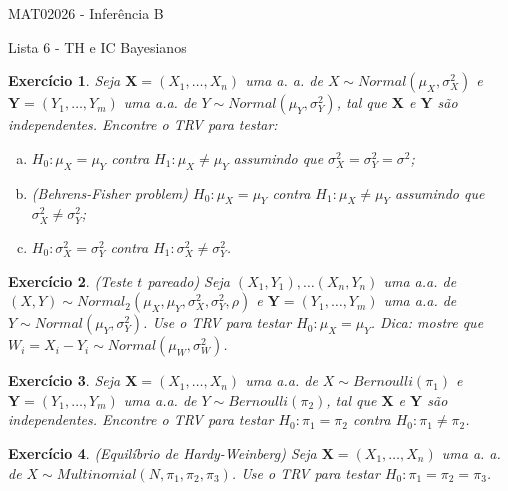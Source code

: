 \documentclass[letter,11pt]{article}
\newtheorem{exer}{Exercício}
\begin{document}
\begin{center}{ \Large MAT02026 - Inferência B }\end{center}

\begin{center}
{\large  \sc Lista 6 - TH e IC Bayesianos}
\end{center}
\vspace{5mm}

\begin{exer} \rm
Seja $\boldsymbol{X} = (X_1, \ldots, X_n)$ uma a. a. de $X \sim Normal(\mu_X, \sigma^2_X)$ e $\boldsymbol{Y} = (Y_1, \ldots, Y_m)$ uma a.a. de $Y \sim Normal(\mu_Y, \sigma^2_Y)$, tal que $\boldsymbol{X}$ e $\boldsymbol{Y}$ são independentes. Encontre o TRV para testar:
\begin{enumerate}[a)]
  \item $H_0: \mu_X = \mu_Y$ contra $H_1: \mu_X \neq \mu_Y$ assumindo que $\sigma^2_X = \sigma^2_Y = \sigma^2$;
  \item \textit{(Behrens-Fisher problem)} $H_0: \mu_X = \mu_Y$ contra $H_1: \mu_X \neq \mu_Y$ assumindo que $\sigma^2_X \neq \sigma^2_Y$;
  \item $H_0: \sigma^2_X = \sigma^2_Y$ contra $H_1: \sigma^2_X \neq \sigma^2_Y$.   
\end{enumerate}
\end{exer}


\begin{exer} \rm
\textit{(Teste $t$ pareado)} Seja $(X_1, Y_1), \ldots (X_n, Y_n)$ uma a.a. de $(X, Y) \sim Normal_2(\mu_X, \mu_Y, \sigma^2_X, \sigma^2_Y, \rho)$ e $\boldsymbol{Y} = (Y_1, \ldots, Y_m)$ uma a.a. de $Y \sim Normal(\mu_Y, \sigma^2_Y)$. Use o TRV para testar $H_0: \mu_X = \mu_Y$. Dica: mostre que $W_i = X_i - Y_i \sim Normal(\mu_W, \sigma^2_W)$. 
\end{exer}


\begin{exer} \rm
Seja $\boldsymbol{X} = (X_1, \ldots, X_n)$ uma a.a. de $X \sim Bernoulli(\pi_1)$ e $\boldsymbol{Y} = (Y_1, \ldots, Y_m)$ uma a.a. de $Y \sim Bernoulli(\pi_2)$, tal que $\boldsymbol{X}$ e $\boldsymbol{Y}$ são independentes. Encontre o TRV para testar $H_0: \pi_1 = \pi_2$ contra $H_0: \pi_1 \neq \pi_2$.
\end{exer}


\begin{exer} \rm
\textit{(Equilíbrio de Hardy-Weinberg)} Seja $\boldsymbol{X} = (X_1, \ldots, X_n)$ uma a. a. de $X \sim Multinomial(N, \pi_1, \pi_2, \pi_3)$. Use o TRV para testar $H_0: \pi_1 = \pi_2 = \pi_3$.  
\end{exer}
\end{document}
